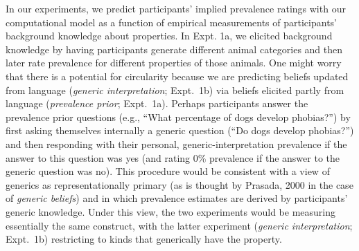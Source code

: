 \documentclass[floatsintext,doc]{apa6}
\begin{document}

In our experiments, we predict participants' implied prevalence ratings with our computational model as a function of empirical measurements of participants' background knowledge about properties. 
In Expt. 1a, we elicited background knowledge by having participants generate different animal categories and then later rate prevalence for different properties of those animals.
One might worry that there is a potential for circularity because we are predicting beliefs updated from language (\emph{generic interpretation}; Expt.~1b) via beliefs elicited partly from language (\emph{prevalence prior}; Expt.~1a).
Perhaps participants answer the prevalence prior questions (e.g., \enquote{What percentage of dogs develop phobias?}) by first asking themselves internally a generic question (\enquote{Do dogs develop phobias?}) and then responding with their personal, generic-interpretation prevalence if the answer to this question was yes (and rating 0\% prevalence if the answer to the generic question was no).
This procedure would be consistent with a view of generics as representationally primary (as is thought by Prasada, 2000 in the case of \emph{generic beliefs}) and in which prevalence estimates are derived by participants' generic knowledge. 
Under this view, the two experiments would be measuring essentially the same construct, with the latter experiment (\emph{generic interpretation}; Expt.~1b) restricting to  kinds that generically have the property. 
\end{document}
